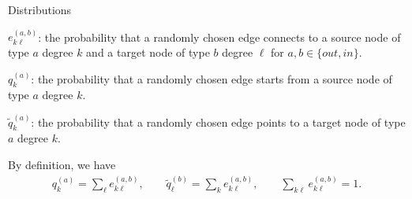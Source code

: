 \documentclass[xcolor=dvipsnames, compress, 10pt]{beamer}
\theoremstyle{remark}
\begin{document}
\begin{frame}{Distributions}

$e_{k\ell}^{(a, b)}$: the probability that a randomly chosen edge connects
to a source node of type $a$ degree $k$ and a target node of type $b$
degree $\ell$ for $a, b \in \{out, in\}$.


$q_k^{(a)}$: the probability that a randomly chosen edge starts from a
source node of type $a$ degree $k$.

$\tilde q_k^{(a)}$: the probability that a randomly chosen edge points to
a target node of type $a$ degree $k$.

\vspace{0.2cm}

By definition, we have 
\begin{align*}
	q_k^{(a)} = \sum_\ell e_{k\ell}^{(a, b)}, \qquad 
	\tilde q_\ell^{(b)} = \sum_k e_{k\ell}^{(a, b)}, \qquad
	\sum_{k \ell} e_{k\ell}^{(a, b)} = 1.
\end{align*}

\end{frame}
	
\end{document}
